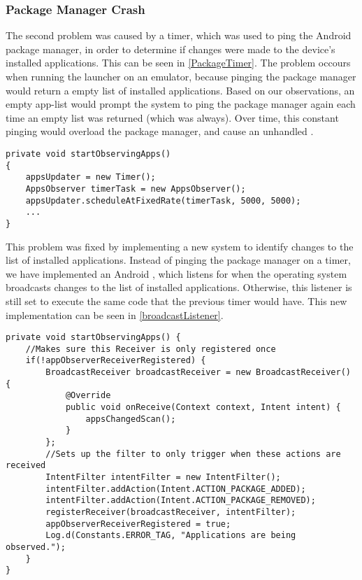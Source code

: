 \subsubsection{Package Manager Crash}
The second problem was caused by a timer, which was used to ping the Android
package manager, in order to determine if changes were made to the device's
installed applications. This can be seen in \autoref{PackageTimer}. The
problem occours when running the launcher on an emulator, because pinging the package
manager would return a empty list of installed applications. Based on our
observations, an empty app-list would prompt the system to ping the package
manager again each time an empty list was returned (which was always). Over
time, this constant pinging would overload the package manager, and cause an
unhandled .\nl

\begin{minipage}[H]{\linewidth}
\begin{lstlisting}[caption = The timer in the \textc{HomeActivity} class which pings the package manager., label = PackageTimer] 
private void startObservingApps() 
{ 
	appsUpdater = new Timer();
    AppsObserver timerTask = new AppsObserver();
    appsUpdater.scheduleAtFixedRate(timerTask, 5000, 5000);
 	...
}   	
\end{lstlisting}
\end{minipage}

This problem was fixed by implementing a new system to identify changes to the
list of installed applications. Instead of pinging the package manager on a
timer, we have implemented an Android , which listens
for when the operating system broadcasts changes to the list of installed
applications. Otherwise, this listener is still set to execute the same code
that the previous timer would have. This new implementation can be seen in
\autoref{broadcastListener}.\nl

\begin{minipage}[H]{\linewidth}
\begin{lstlisting}[caption = New implementation of a \textc{broadcastReceiver}., label = broadcastListener] 
private void startObservingApps() {
	//Makes sure this Receiver is only registered once
    if(!appObserverReceiverRegistered) {
    	BroadcastReceiver broadcastReceiver = new BroadcastReceiver() {
            @Override
            public void onReceive(Context context, Intent intent) {
        	    appsChangedScan();
            }
        };
        //Sets up the filter to only trigger when these actions are received
        IntentFilter intentFilter = new IntentFilter(); 
        intentFilter.addAction(Intent.ACTION_PACKAGE_ADDED);
        intentFilter.addAction(Intent.ACTION_PACKAGE_REMOVED);
        registerReceiver(broadcastReceiver, intentFilter);
        appObserverReceiverRegistered = true;
        Log.d(Constants.ERROR_TAG, "Applications are being observed.");
	}
}
\end{lstlisting}
\end{minipage}

